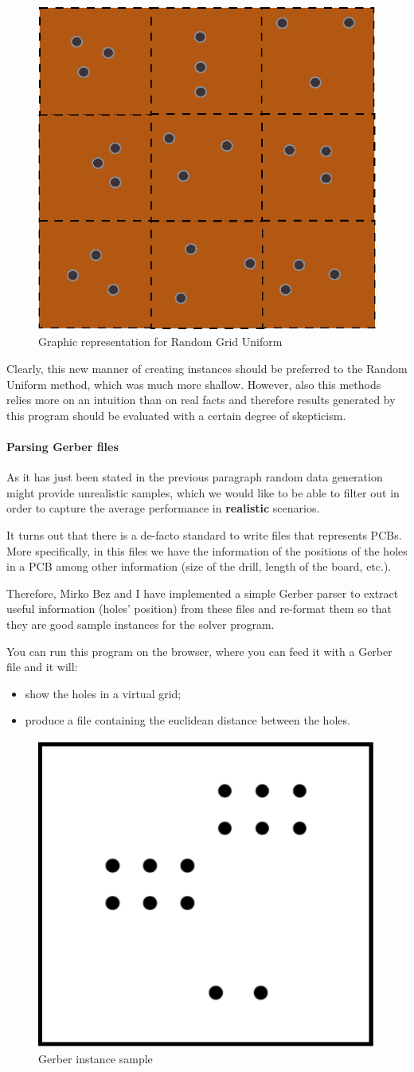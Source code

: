 \begin{figure}[H]
  \centering
  \includegraphics[width=.5\columnwidth]{pics/ru-grid.eps}
  \caption{Graphic representation for Random Grid Uniform}
  \label{fig:ru-grid-sketch}
\end{figure}

Clearly, this new manner of creating instances should be preferred to the
Random Uniform method, which was much more shallow. However, also this methods
relies more on an intuition than on real facts and therefore results generated
by this program should be evaluated with a certain degree of skepticism.

\paragraph{Parsing Gerber files} As it has just been stated in the previous
paragraph random data generation might provide unrealistic samples, which
we would like to be able to filter out in order to capture the average
performance in \textbf{realistic} scenarios.

It turns out that there is a de-facto standard to write files that represents
PCBs. More specifically, in this files we have the information of the positions
of the holes in a PCB among other information (size of the drill, length of the
board, etc.).

Therefore, Mirko Bez and I have implemented a simple Gerber parser to extract
useful information (holes' position) from these files and re-format them so
that they are good sample instances for the solver program.

You can run this program on the browser, where you can feed it with a Gerber
file and it will:
\begin{itemize}
	\item show the holes in a virtual grid;
	\item produce a file containing the euclidean distance between the holes.
\end{itemize}

\begin{figure}[H]
  \centering
  \includegraphics[width=.5\columnwidth]{pics/gerber.eps}
  \caption{Gerber instance sample}
  \label{fig:gerber-instance-pic}
\end{figure}
